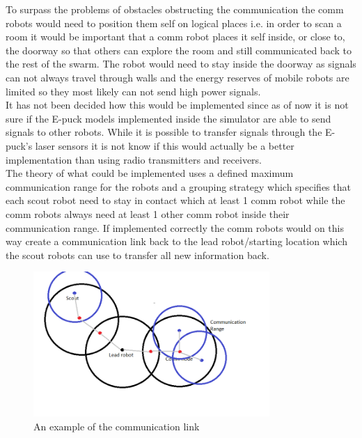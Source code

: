 To surpass the problems of obstacles obstructing the communication the comm robots would need to position them self on logical places i.e. in order to scan a room it would be important that a comm robot places it self inside, or close to, the doorway so that others can explore the room and still communicated back to the rest of the swarm. The robot would need to stay inside the doorway as signals can not always travel through walls and the energy reserves of mobile robots are limited so they most likely can not send high power signals. \\
It has not been decided how this would be implemented since as of now it is not sure if the E-puck models implemented inside the simulator are able to send signals to other robots. While it is possible  to transfer signals through the E-puck's laser sensors it is not know if this would actually be a better implementation than using radio transmitters and receivers.\\[3ex]

The theory of what could be  implemented uses a defined maximum communication range for the robots and a grouping strategy which specifies that each scout robot need to stay in contact which at least 1 comm robot while the comm robots always need at least 1 other comm robot inside their communication range. If implemented correctly the comm robots would on this way create a communication link back to the lead robot/starting location which the scout robots can use to transfer all new information back.\\

\begin{figure}[h]
\centering
\includegraphics[width = 0.8\textwidth]{../../figures/comm_example.png} 
\caption{An example of the communication link}
\label{comm_link_example}
\end{figure}

